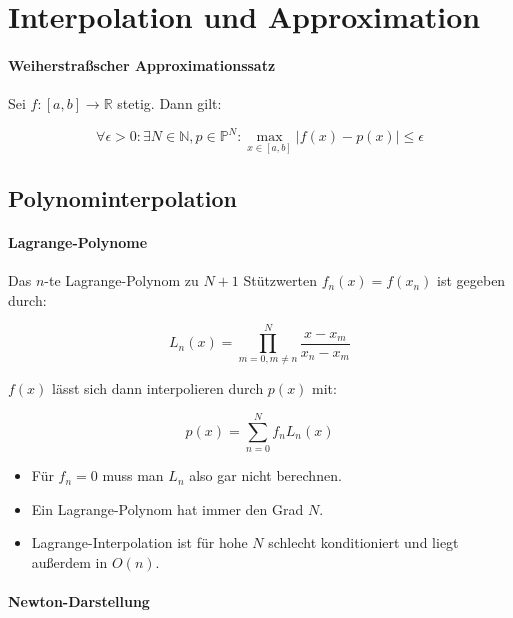 \documentclass[a4paper, 14pt]{article}
\begin{document}
	\section{Interpolation und Approximation}

	\paragraph{Weiherstraßscher Approximationssatz}

	Sei $f : [a, b] \to \mathbb{R}$ stetig. Dann gilt:

	\begin{equation}
		\forall \epsilon > 0 : \exists N \in \mathbb{N}, p \in \mathbb{P}^N : \max_{x \in [a, b]}{|f(x) - p(x)|} \leq \epsilon
	\end{equation}

	\subsection{Polynominterpolation}

	\paragraph{Lagrange-Polynome} Das $n$-te Lagrange-Polynom zu $N + 1$ Stützwerten $f_n(x) = f(x_n)$ ist gegeben durch:

	\begin{equation}
		L_n(x) = \prod_{m = 0,m \neq n}^{N}{\frac{x - x_m}{x_n - x_m}}
	\end{equation}

	$f(x)$ lässt sich dann interpolieren durch $p(x)$ mit:

	\begin{equation}
		p(x) = \sum_{n = 0}^{N}{f_n L_n(x)}
	\end{equation}

	\begin{itemize}
		\item Für $f_n = 0$ muss man $L_n$ also gar nicht berechnen.
		\item Ein Lagrange-Polynom hat immer den Grad $N$.
		\item Lagrange-Interpolation ist für hohe $N$ schlecht konditioniert und liegt außerdem in $O(n)$.
	\end{itemize}

	\paragraph{Newton-Darstellung}
\end{document}
